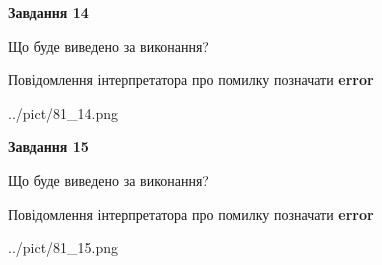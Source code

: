 \documentclass[11pt, ukrainian]{article}
\begin{document}
{\begin {large}
{\begin {center}\textbf{Завдання 14}\end {center}}\par
Що буде виведено за виконання? \par
Повідомлення інтерпретатора про помилку позначати \textbf{error}

\begin{center}
	{../pict/81_14.png}
\end{center}
\newpage

{\begin {center}\textbf{Завдання 15}\end {center}}\par
Що буде виведено за виконання? \par
Повідомлення інтерпретатора про помилку позначати \textbf{error}

\begin{center}
	{../pict/81_15.png}
\end{center}
\newpage

\end {large}}
\end{document}
